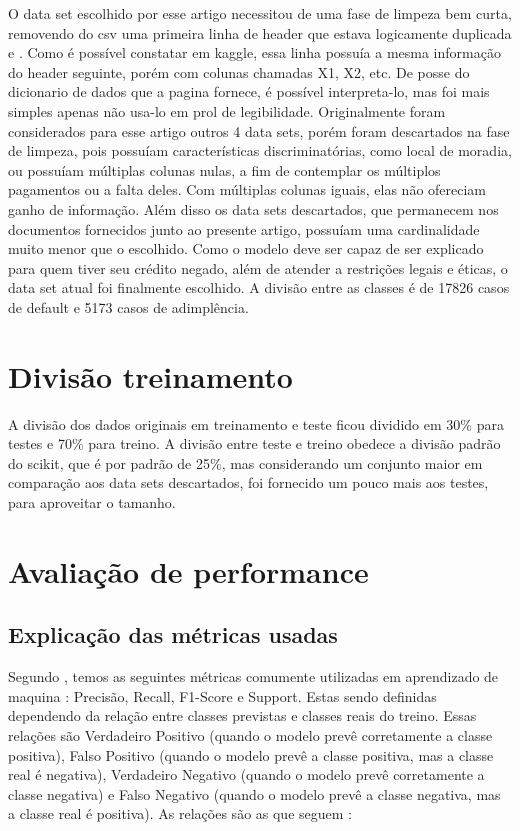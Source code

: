 \documentclass[12pt]{article}
\begin{document}
O data set escolhido por esse artigo\cite{dataset} necessitou de uma fase de limpeza bem curta, removendo do csv uma primeira linha de header que estava logicamente duplicada e . Como é possível constatar em kaggle\cite{kaggle}, essa linha possuía a mesma informação do header seguinte, porém com colunas chamadas X1, X2, etc. De posse do dicionario de dados que a pagina fornece, é possível interpreta-lo, mas foi mais simples apenas não usa-lo em prol de legibilidade. Originalmente foram considerados para esse artigo outros 4 data sets, porém foram descartados na fase de limpeza, pois possuíam características discriminatórias, como local de moradia, ou possuíam múltiplas colunas nulas, a fim de contemplar os múltiplos pagamentos ou a falta deles. Com múltiplas colunas iguais, elas não ofereciam ganho de informação. Além disso os data sets descartados, que permanecem nos documentos fornecidos junto ao presente artigo, possuíam uma cardinalidade muito menor que o escolhido. Como o modelo deve ser capaz de ser explicado para quem tiver seu crédito negado, além de atender a restrições legais e éticas, o data set atual foi finalmente escolhido. A divisão entre as classes é de 17826 casos de default e 5173 casos de adimplência.

\section{Divisão treinamento}

A divisão dos dados originais em treinamento e teste ficou dividido em 30\% para testes e 70\% para treino. A divisão entre teste e treino obedece a divisão padrão do scikit, que é por padrão de 25\%, mas considerando um conjunto maior em comparação aos data sets descartados, foi fornecido um pouco mais aos testes, para aproveitar o tamanho.

\section{Avaliação de performance}
\subsection{Explicação das métricas usadas}
Segundo \cite{powers2011evaluation}, temos as seguintes métricas comumente utilizadas em aprendizado de maquina : Precisão, Recall, F1-Score e Support. Estas sendo definidas dependendo da relação entre classes previstas e classes reais do treino. Essas relações são Verdadeiro Positivo (quando o modelo prevê corretamente a classe positiva), Falso Positivo (quando o modelo prevê a classe positiva, mas a classe real é negativa), Verdadeiro Negativo (quando o modelo prevê corretamente a classe negativa) e Falso Negativo (quando o modelo prevê a classe negativa, mas a classe real é positiva). As relações são as que seguem :
\end{document}
